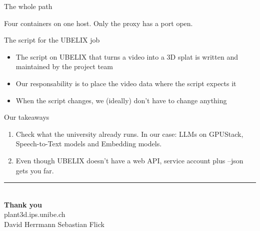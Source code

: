 \documentclass[aspectratio=169,11pt]{beamer}
\newcommand{\key}[1]{{\color{ubBlue}\ttfamily #1}}
\begin{document}
\begin{frame}{The whole path}
\begin{center}
{}
  \end{center}
  \vspace{0.25em}
  {\small\color{ubMuted}Four containers on one host. Only the proxy has a port open.}
\end{frame}


\begin{frame}{The script for the UBELIX job}
  \begin{itemize}\setlength\itemsep{0.8em}
    \item The script on UBELIX that turns a video into a 3D splat is written and maintained by the project team
    \item Our responsability is to place the video data where the script expects it
    \item When the script changes, we (ideally) don't have to change anything
  \end{itemize}
  \vspace{1.2em}
\end{frame}

\begin{frame}{Our takeaways}
  \begin{enumerate}\setlength\itemsep{1.0em}
    \item Check what the university already runs. In our case: LLMs on GPUStack, Speech-to-Text models and Embedding models.
    \item Even though UBELIX doesn't have a web API, service account plus \key{--json} gets you far.
  \end{enumerate}
\end{frame}


\begin{frame}[plain]
  \vfill
  \begin{center}
    {\color{ubRed}\rule{3em}{2.5pt}}\\[0.8em]
    {\color{white}\Huge\bfseries Thank you}\\[1.0em]
    {\color{ubText}\large plant3d.ips.unibe.ch}\\[0.4em]
    {\color{ubMuted}David Herrmann \quad\textbar\quad Sebastian Flick}
  \end{center}
  \vfill
\end{frame}
\end{document}
